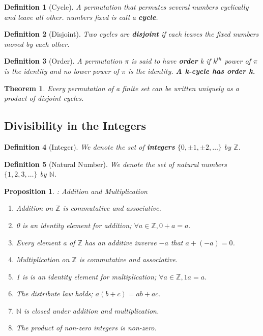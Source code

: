 \documentclass[12pt]{article}
\newtheorem{definition}{Definition}[subsection]
\newtheorem{theorem}{Theorem}[subsection]
\newtheorem{proposition}{Proposition}[subsection]
\begin{document}
    \begin{definition}[Cycle]
        A permutation that permutes several numbers cyclically and leave all other. numbers fixed is call a \textbf{cycle}.
    \end{definition}
    \begin{definition}[Disjoint]
        Two cycles are \textbf{disjoint} if each leaves the fixed numbers moved by each other.
    \end{definition}
    \begin{definition}[Order]
        A permutation $\pi$ is said to have \textbf{order} k if $k^{th}$ power of $\pi$ is the identity and no lower power of $\pi$ is the identity. \textbf{A k-cycle has order k.}
    \end{definition}
    \begin{theorem}
        Every permutation of a finite set can be written uniquely as a product of disjoint cycles.
    \end{theorem}

\subsection{Divisibility in the Integers}

    \begin{definition}[Integer]
        We denote the set of \textbf{integers} $\{0, \pm1, \pm2, \hdots\}$ by $\mathbb{Z}$.
    \end{definition}
    \begin{definition}[Natural Number]
     We denote the set of natural numbers $\{1,2,3,\hdots\}$ by $\mathbb{N}$.
    \end{definition}

    \begin{proposition} : Addition and Multiplication\\
        \begin{enumerate}
            \item Addition on $\mathbb{Z}$ is commutative and associative.
            \item 0 is an identity element for addition; $\forall a \in \mathbb{Z}, 0+a=a$.
            \item Every element a of $\mathbb{Z}$ has an additive inverse $-a$ that  $a + (-a) = 0$.
            \item Multiplication on $\mathbb{Z}$ is commutative and associative.
            \item 1 is is an identity element for multiplication; $\forall a \in \mathbb{Z}, 1a = a$.
            \item The distribute law holds; $a(b + c) = ab + ac$.
            \item $\mathbb{N}$ is closed under addition and multiplication.
            \item The product of non-zero integers is non-zero.
        \end{enumerate}
    \end{proposition}
    
\end{document}
